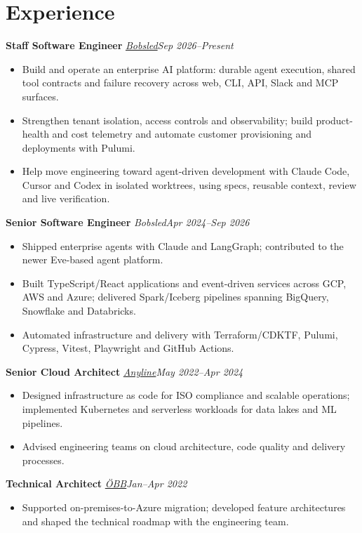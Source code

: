 \documentclass[11pt,a4paper]{article}
\newcommand{\role}[3]{\textbf{#1} \textit{#2}\hfill\textit{#3}\par}
\begin{document}
\section*{Experience}
\role{Staff Software Engineer}{\href{https://bobsled.co}{Bobsled}}{Sep 2026--Present}
\begin{itemize}
\item Build and operate an enterprise AI platform: durable agent execution, shared tool contracts and failure recovery across web, CLI, API, Slack and MCP surfaces.
\item Strengthen tenant isolation, access controls and observability; build product-health and cost telemetry and automate customer provisioning and deployments with Pulumi.
\item Help move engineering toward agent-driven development with Claude Code, Cursor and Codex in isolated worktrees, using specs, reusable context, review and live verification.
\end{itemize}
\vspace{2pt}
\role{Senior Software Engineer}{Bobsled}{Apr 2024--Sep 2026}
\begin{itemize}
\item Shipped enterprise agents with Claude and LangGraph; contributed to the newer Eve-based agent platform.
\item Built TypeScript/React applications and event-driven services across GCP, AWS and Azure; delivered Spark/Iceberg pipelines spanning BigQuery, Snowflake and Databricks.
\item Automated infrastructure and delivery with Terraform/CDKTF, Pulumi, Cypress, Vitest, Playwright and GitHub Actions.
\end{itemize}
\vspace{2pt}
\role{Senior Cloud Architect}{\href{https://anyline.com}{Anyline}}{May 2022--Apr 2024}
\begin{itemize}
\item Designed infrastructure as code for ISO compliance and scalable operations; implemented Kubernetes and serverless workloads for data lakes and ML pipelines.
\item Advised engineering teams on cloud architecture, code quality and delivery processes.
\end{itemize}
\vspace{2pt}
\role{Technical Architect}{\href{https://www.oebb.at/}{\"OBB}}{Jan--Apr 2022}
\begin{itemize}
\item Supported on-premises-to-Azure migration; developed feature architectures and shaped the technical roadmap with the engineering team.
\end{itemize}
\end{document}
